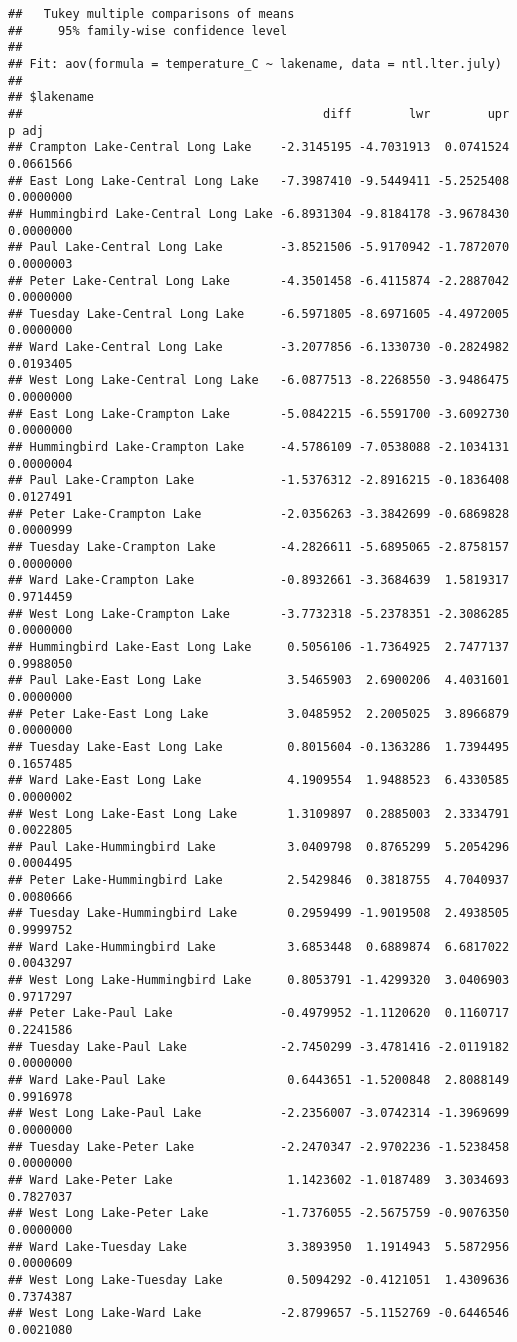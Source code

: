 \documentclass[
]{article}
\begin{document}
\begin{verbatim}
##   Tukey multiple comparisons of means
##     95% family-wise confidence level
## 
## Fit: aov(formula = temperature_C ~ lakename, data = ntl.lter.july)
## 
## $lakename
##                                          diff        lwr        upr     p adj
## Crampton Lake-Central Long Lake    -2.3145195 -4.7031913  0.0741524 0.0661566
## East Long Lake-Central Long Lake   -7.3987410 -9.5449411 -5.2525408 0.0000000
## Hummingbird Lake-Central Long Lake -6.8931304 -9.8184178 -3.9678430 0.0000000
## Paul Lake-Central Long Lake        -3.8521506 -5.9170942 -1.7872070 0.0000003
## Peter Lake-Central Long Lake       -4.3501458 -6.4115874 -2.2887042 0.0000000
## Tuesday Lake-Central Long Lake     -6.5971805 -8.6971605 -4.4972005 0.0000000
## Ward Lake-Central Long Lake        -3.2077856 -6.1330730 -0.2824982 0.0193405
## West Long Lake-Central Long Lake   -6.0877513 -8.2268550 -3.9486475 0.0000000
## East Long Lake-Crampton Lake       -5.0842215 -6.5591700 -3.6092730 0.0000000
## Hummingbird Lake-Crampton Lake     -4.5786109 -7.0538088 -2.1034131 0.0000004
## Paul Lake-Crampton Lake            -1.5376312 -2.8916215 -0.1836408 0.0127491
## Peter Lake-Crampton Lake           -2.0356263 -3.3842699 -0.6869828 0.0000999
## Tuesday Lake-Crampton Lake         -4.2826611 -5.6895065 -2.8758157 0.0000000
## Ward Lake-Crampton Lake            -0.8932661 -3.3684639  1.5819317 0.9714459
## West Long Lake-Crampton Lake       -3.7732318 -5.2378351 -2.3086285 0.0000000
## Hummingbird Lake-East Long Lake     0.5056106 -1.7364925  2.7477137 0.9988050
## Paul Lake-East Long Lake            3.5465903  2.6900206  4.4031601 0.0000000
## Peter Lake-East Long Lake           3.0485952  2.2005025  3.8966879 0.0000000
## Tuesday Lake-East Long Lake         0.8015604 -0.1363286  1.7394495 0.1657485
## Ward Lake-East Long Lake            4.1909554  1.9488523  6.4330585 0.0000002
## West Long Lake-East Long Lake       1.3109897  0.2885003  2.3334791 0.0022805
## Paul Lake-Hummingbird Lake          3.0409798  0.8765299  5.2054296 0.0004495
## Peter Lake-Hummingbird Lake         2.5429846  0.3818755  4.7040937 0.0080666
## Tuesday Lake-Hummingbird Lake       0.2959499 -1.9019508  2.4938505 0.9999752
## Ward Lake-Hummingbird Lake          3.6853448  0.6889874  6.6817022 0.0043297
## West Long Lake-Hummingbird Lake     0.8053791 -1.4299320  3.0406903 0.9717297
## Peter Lake-Paul Lake               -0.4979952 -1.1120620  0.1160717 0.2241586
## Tuesday Lake-Paul Lake             -2.7450299 -3.4781416 -2.0119182 0.0000000
## Ward Lake-Paul Lake                 0.6443651 -1.5200848  2.8088149 0.9916978
## West Long Lake-Paul Lake           -2.2356007 -3.0742314 -1.3969699 0.0000000
## Tuesday Lake-Peter Lake            -2.2470347 -2.9702236 -1.5238458 0.0000000
## Ward Lake-Peter Lake                1.1423602 -1.0187489  3.3034693 0.7827037
## West Long Lake-Peter Lake          -1.7376055 -2.5675759 -0.9076350 0.0000000
## Ward Lake-Tuesday Lake              3.3893950  1.1914943  5.5872956 0.0000609
## West Long Lake-Tuesday Lake         0.5094292 -0.4121051  1.4309636 0.7374387
## West Long Lake-Ward Lake           -2.8799657 -5.1152769 -0.6446546 0.0021080
\end{verbatim}
\end{document}
